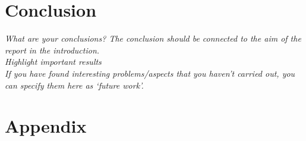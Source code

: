 \documentclass[11pt, fleqn, titlepage]{article}
\begin{document}
\section{Conclusion}
\textit{What are your conclusions? The conclusion should be connected to the aim of the report in the introduction. \\ Highlight important results \\ If you have found interesting problems/aspects that you haven’t carried out, you can specify them here as ‘future work’.}

\section{Appendix}




\end{document}
